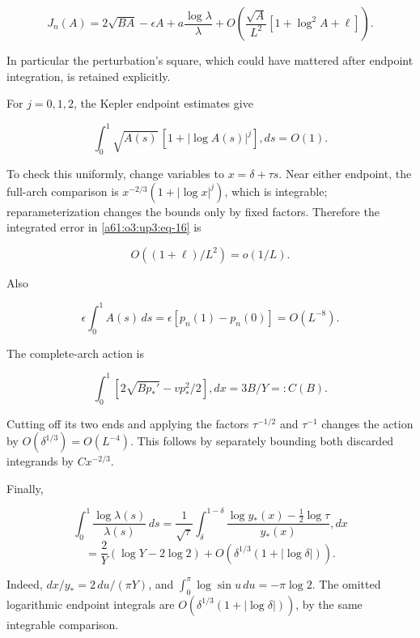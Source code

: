 \documentclass[11pt,letterpaper]{article}
\numberwithin{equation}{section}
\theoremstyle{remark}\newtheorem{remark}[theorem]{Remark}
\begin{document}
\begin{equation}
J_n(A)=2\sqrt{BA}-\epsilon A
       +a\frac{\log\lambda}{\lambda}
       +O\left(\frac{\sqrt A}{L^2}
          [1+\log^2 A+\ell]\right).
\label{a61:o3:up3:eq-16}
\end{equation}

In particular the perturbation's square, which could have mattered after
endpoint integration, is retained explicitly.

For \(j=0,1,2\), the Kepler endpoint estimates give

\begin{equation}
\int_0^1\sqrt{A(s)}\,[1+|\log A(s)|^j],ds=O(1).
\label{a61:o3:up3:eq-17}
\end{equation}

To check this uniformly, change variables to \(x=\delta+\tau s\). Near
either endpoint, the full-arch comparison is \(x^{-2/3}(1+|\log x|^j)\),
which is integrable; reparameterization changes the bounds only by fixed
factors. Therefore the integrated error in \eqref{a61:o3:up3:eq-16} is

\begin{equation}
O((1+\ell)/L^2)=o(1/L).
\label{a61:o3:up3:eq-18}
\end{equation}

Also

\begin{equation}
\epsilon\int_0^1A(s)\,ds
 =\epsilon[p_n(1)-p_n(0)]=O(L^{-8}).
\label{a61:o3:up3:eq-19}
\end{equation}

The complete-arch action is

\[
\int_0^1[2\sqrt{Bp_*'}-vp_*^2/2],dx=3B/Y=:C(B).
\]

Cutting off its two ends and applying the factors \(\tau^{-1/2}\) and
\(\tau^{-1}\) changes the action by \(O(\delta^{1/3})=O(L^{-4})\). This
follows by separately bounding both discarded integrands by
\(Cx^{-2/3}\).

Finally,

\[
\int_0^1\frac{\log\lambda(s)}{\lambda(s)}\,ds
 =\frac1{\sqrt\tau}\int_\delta^{1-\delta}
  \frac{\log y_*(x)-\tfrac12\log\tau}{y_*(x)},dx
\] \begin{equation}
 =\frac2Y(\log Y-2\log2)
  +O(\delta^{1/3}(1+|\log\delta|)).
\label{a61:o3:up3:eq-20}
\end{equation}

Indeed, \(dx/y_*=2\,du/(\pi Y)\), and
\(\int_0^\pi\log\sin u\,du=-\pi\log2\). The omitted logarithmic endpoint
integrals are \(O(\delta^{1/3}(1+|\log\delta|))\), by the same
integrable comparison.
\end{document}
